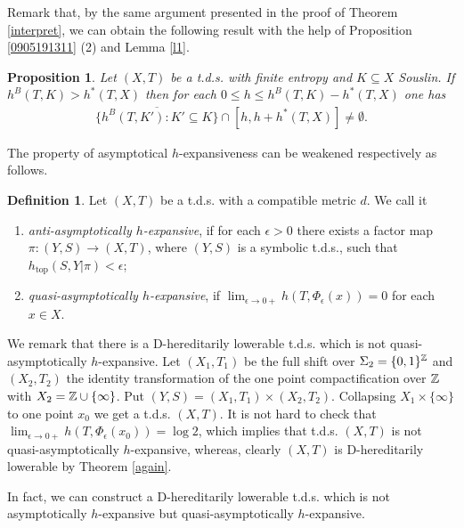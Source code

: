\documentclass[12pt]{amsart}
\newtheorem{prop}[thm]{Proposition}
\theoremstyle{definition} \theoremstyle{question}
\newtheorem{defn}[thm]{Definition}
\numberwithin{equation}{section}
\begin{document}
Remark that, by the same argument presented in the proof of Theorem
\ref{interpret}, we can obtain the following result with the help of
Proposition \ref{0905191311} (2) and Lemma \ref{l1}.

\begin{prop}
Let $(X, T)$ be a t.d.s. with finite entropy and $K\subseteq X$ Souslin. If $h^B (T, K)> h^* (T, X)$ then for each $0\le h\le h^B (T,
K)- h^* (T, X)$ one has
\begin{eqnarray*}
\overline{\{h^B (T, K'): K'\subseteq K\}}\cap [h,
h+ h^* (T, X)]\neq \emptyset.
\end{eqnarray*}
\end{prop}

The property of asymptotical $h$-expansiveness can be weakened
respectively as follows.

\begin{defn}
Let $(X, T)$ be a t.d.s. with a compatible metric $d$. We call it
\begin{enumerate}

\item {\it anti-asymptotically $h$-expansive}, if for
each $\epsilon> 0$ there exists a factor map $\pi: (Y, S)\rightarrow
(X, T)$, where $(Y, S)$ is a symbolic t.d.s., such that
$h_{\text{top}} (S, Y| \pi)< \epsilon$;

\item {\it quasi-asymptotically $h$-expansive}, if
 $\lim_{\epsilon\rightarrow 0+} h (T, \Phi_{\epsilon} (x))= 0$
for each $x\in X$.

\end{enumerate}
\end{defn}

We remark that there is a D-hereditarily lowerable t.d.s. which is
not quasi-asymptotically $h$-expansive. Let $(X_1, T_1)$ be the full
shift over $\Sigma_2= \{0, 1\}^{\Bbb Z}$ and $(X_2, T_2)$ the identity
transformation of the one point compactification over ${\Bbb Z}$ with
$X_2= {\Bbb Z}\cup \{\infty\}$. Put $(Y, S)= (X_1, T_1)\times (X_2, T_2)$.
Collapsing $X_1\times \{\infty\}$ to one point $x_0$ we get a t.d.s.
$(X, T)$. It is not hard to check that $\lim_{{\epsilon}\rightarrow 0+} h
(T, \Phi_{\epsilon} (x_0))= \log 2$, which implies that t.d.s. $(X, T)$ is
not quasi-asymptotically $h$-expansive, whereas, clearly $(X, T)$ is
D-hereditarily lowerable by Theorem \ref{again}.

In fact, we can construct a D-hereditarily lowerable t.d.s. which is
not asymptotically $h$-expansive but quasi-asymptotically
$h$-expansive.
\end{document}

